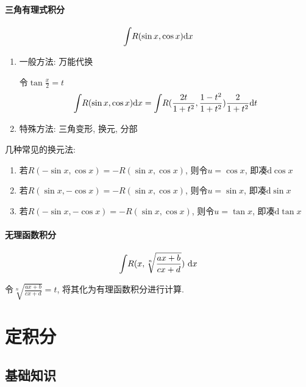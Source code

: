 \subsubsection{三角有理式积分}
\begin{equation*}
\displaystyle\int_{}\hspace{.2em}R(\sin x, \cos x)\mathrm{d}x
\end{equation*}\par
\begin{enumerate}
\item 一般方法: 万能代换 \par
令$ \tan \frac{x}{2}=t $
\begin{equation*}
\displaystyle\int_{}\hspace{.2em}R(\sin x, \cos x)\mathrm{d}x=\displaystyle\int_{}\hspace{.2em}R(\frac{2t}{1+t^{2}}, \frac{1-t^{2}}{1+t^{2}})\frac{2}{1+t^{2}}\mathrm{d}t
\end{equation*}
\item 特殊方法: 三角变形, 换元, 分部
\end{enumerate}
\begin{tcolorbox}
几种常见的换元法:
\begin{enumerate}
\item 若$ R(-\sin x, \cos x)=-R(\sin x, \cos x) $, 则令$ u=\cos x $, 即凑$ \mathrm{d}\cos x $
\item 若$ R(\sin x, -\cos x)=-R(\sin x, \cos x) $, 则令$ u=\sin x $, 即凑$ \mathrm{d}\sin x $
\item 若$ R(-\sin x, -\cos x)=-R(\sin x, \cos x) $, 则令$ u=\tan x $, 即凑$ \mathrm{d}\tan x $
\end{enumerate}
\end{tcolorbox}
\subsubsection{无理函数积分}
\begin{equation*}
\displaystyle\int_{}\hspace{.2em}R(x, \sqrt[n]{\frac{ax+b}{cx+d}})\ \mathrm{d}x
\end{equation*}\par
令$ \sqrt[n]{\frac{ax+b}{cx+d}}=t $, 将其化为有理函数积分进行计算.
\chapter{定积分}
\section{基础知识}
